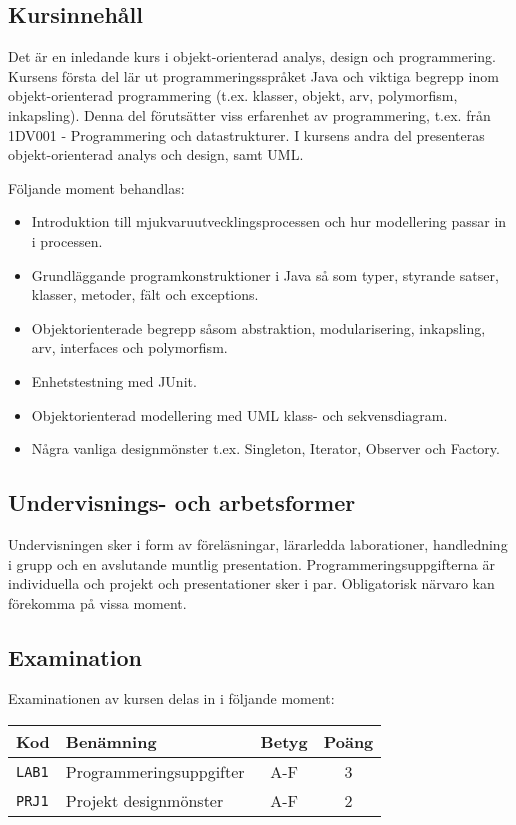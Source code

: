 \subsection*{Kursinnehåll}

Det är en inledande kurs i objekt-orienterad analys, design och
programmering. Kursens första del lär ut programmeringsspråket Java och
viktiga begrepp inom objekt-orienterad programmering (t.ex. klasser,
objekt, arv, polymorfism, inkapsling). Denna del förutsätter viss
erfarenhet av programmering, t.ex. från 1DV001 - Programmering och
datastrukturer. I kursens andra del presenteras objekt-orienterad analys
och design, samt UML.

Följande moment behandlas:

\begin{itemize}
\tightlist
\item
  Introduktion till mjukvaruutvecklingsprocessen och hur modellering
  passar in i processen.
\item
  Grundläggande programkonstruktioner i Java så som typer, styrande
  satser, klasser, metoder, fält och exceptions.
\item
  Objektorienterade begrepp såsom abstraktion, modularisering,
  inkapsling, arv, interfaces och polymorfism.
\item
  Enhetstestning med JUnit.
\item
  Objektorienterad modellering med UML klass- och sekvensdiagram.
\item
  Några vanliga designmönster t.ex. Singleton, Iterator, Observer och
  Factory.
\end{itemize}

\subsection*{Undervisnings- och
arbetsformer}

Undervisningen sker i form av föreläsningar, lärarledda laborationer,
handledning i grupp och en avslutande muntlig presentation.
Programmeringsuppgifterna är individuella och projekt och presentationer
sker i par. Obligatorisk närvaro kan förekomma på vissa moment.

\subsection*{Examination}

Examinationen av kursen delas in i följande moment:

\begin{longtable}[]{@{}llcc@{}}
\toprule
\textsf{Kod} & \textsf{Benämning} & \textsf{Betyg} & \textsf{Poäng}\tabularnewline
\midrule
\endhead
\texttt{LAB1} & Programmeringsuppgifter & A-F & 3\tabularnewline
\texttt{PRJ1} & Projekt designmönster & A-F & 2\tabularnewline
\bottomrule
\end{longtable}

